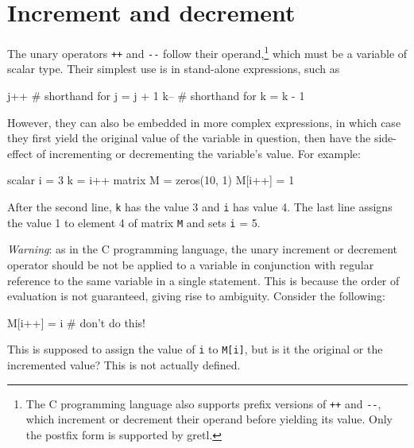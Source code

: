 \section{Increment and decrement}

The unary operators \texttt{++} and \verb|--| follow their
operand,\footnote{The C programming language also supports prefix
  versions of \texttt{++} and \verb|--|, which increment or decrement
  their operand before yielding its value. Only the postfix form is
  supported by gretl.}  which must be a variable of scalar
type. Their simplest use is in stand-alone expressions, such as
%
\begin{code}
j++  # shorthand for j = j + 1
k--  # shorthand for k = k - 1
\end{code}
%
However, they can also be embedded in more complex expressions, in
which case they first yield the original value of the variable in
question, then have the side-effect of incrementing or decrementing
the variable's value. For example:
%
\begin{code}
scalar i = 3
k = i++
matrix M = zeros(10, 1)
M[i++] = 1
\end{code}
%
After the second line, \texttt{k} has the value 3 and \texttt{i} has
value 4. The last line assigns the value 1 to element 4 of
matrix \texttt{M} and sets \texttt{i} = 5.

\textit{Warning}: as in the C programming language, the unary
increment or decrement operator should be not be applied to a
variable in conjunction with regular reference to the same variable in
a single statement. This is because the order of evaluation is not
guaranteed, giving rise to ambiguity. Consider the following:
%
\begin{code}
M[i++] = i # don't do this!
\end{code}
%
This is supposed to assign the value of \texttt{i} to \texttt{M[i]},
but is it the original or the incremented value? This is not actually
defined. 











